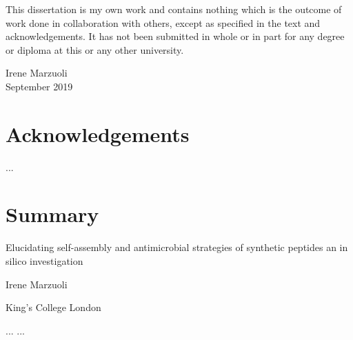 
\vspace{.2cm}

\noindent This dissertation is my own work and contains nothing which is the outcome of work done in collaboration with others, except as specified in the text and acknowledgements.
%
It has not been submitted in whole or in part for any degree or diploma at this or any other university.

\vspace{1.5cm}

\begin{raggedleft}
Irene Marzuoli \\
September 2019

\end{raggedleft}


%
%

\thispagestyle{empty}
\chapter*{Acknowledgements}
%
...


%
%

\thispagestyle{empty}
\chapter*{Summary}

\begin{center}

{\Large\sffamily Elucidating self-assembly and antimicrobial strategies of synthetic peptides an in silico investigation}

\vspace{.2cm}

{\large\sffamily Irene Marzuoli}

\vspace{.03cm}

{\large\sffamily King's College London}
%
\vspace{.2cm}

\end{center}
%
\noindent
%
...
%
...

